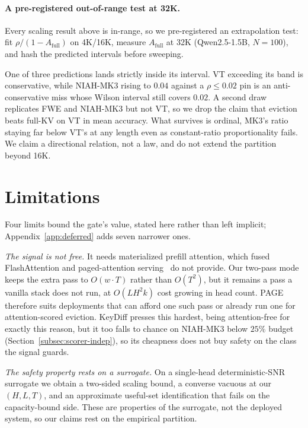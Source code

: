 \documentclass{article}
\newcommand{\method}{PAGE\xspace}
\begin{document}
\paragraph{A pre-registered out-of-range test at 32K.}
\label{subsec:prereg32k}
Every scaling result above is in-range, so we pre-registered an extrapolation
test: fit $\rho / (1 - A_{\mathrm{full}})$ on 4K/16K, measure
$A_{\mathrm{full}}$ at 32K (Qwen2.5-1.5B, $N = 100$), and hash the predicted
intervals before sweeping.

One of three predictions lands strictly inside its interval. VT exceeding its
band is conservative, while NIAH-MK3 rising to $0.04$ against a $\rho \le
0.02$ pin is an anti-conservative miss whose Wilson interval still covers
$0.02$. A second draw replicates FWE and NIAH-MK3 but not VT, so we drop the
claim that eviction beats full-KV on VT in mean accuracy. What survives is
ordinal, MK3's ratio staying far below VT's at any length even as constant-ratio proportionality fails. We claim a directional relation, not a law, and
do not extend the partition beyond 16K.

\section{Limitations}
\label{sec:limitations}

Four limits bound the gate's value, stated here rather than left implicit;
Appendix~\ref{app:deferred} adds seven narrower ones.

\emph{The signal is not free.} It needs materialized prefill attention, which
fused FlashAttention and paged-attention serving~\citep{kwon2023efficient} do
not provide. Our two-pass mode keeps the extra pass to $O(w \cdot T)$ rather
than $O(T^2)$, but it remains a pass a vanilla stack does not run, at
$O(LH^2k)$ cost growing in head count. \method therefore suits deployments
that can afford one such pass or already run one for attention-scored
eviction. KeyDiff presses this hardest, being attention-free for exactly this
reason, but it too falls to chance on NIAH-MK3 below $25\%$ budget
(Section~\ref{subsec:scorer-indep}), so its cheapness does not buy safety on
the class the signal guards.

\emph{The safety property rests on a surrogate.} On a single-head
deterministic-SNR surrogate we obtain a two-sided scaling bound, a converse
vacuous at our $(H, L, T)$, and an approximate useful-set identification that
fails on the capacity-bound side. These are properties of the surrogate, not
the deployed system, so our claims rest on the empirical partition.
\end{document}
